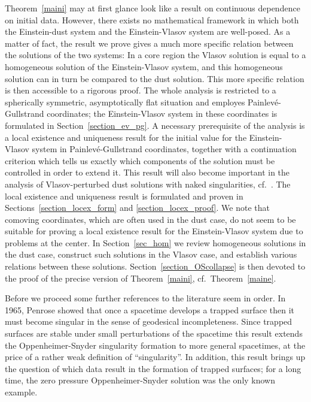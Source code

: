 \documentclass[11pt]{article}
\begin{document}
Theorem~\ref{maini} may
at first glance look like a result on continuous dependence on initial data.
However, there exists no mathematical framework in which both the Einstein-dust
system and the Einstein-Vlasov system are well-posed. As a matter of fact,
the result we prove gives a much more specific relation between the
solutions of the two systems: In a core region the Vlasov solution
is equal to a homogeneous solution of the Einstein-Vlasov system,
and this homogeneous solution can in turn be compared to the dust solution.
This more specific relation is then accessible to a rigorous proof.
The whole analysis is restricted to a spherically symmetric, asymptotically
flat situation and employes Painlev\'{e}-Gullstrand coordinates;
the Einstein-Vlasov system in these coordinates is formulated in
Section~\ref{section_ev_pg}.
A necessary prerequisite of the analysis is a local existence
and uniqueness result for the initial value for the
Einstein-Vlasov system in Painlev\'{e}-Gullstrand coordinates, 
together with a continuation criterion which tells us exactly which
components of the solution must be controlled in order to extend it.
This result will also become important in the analysis of
Vlasov-perturbed dust solutions with naked singularities, cf.~\cite{AR_naked}. 
The local existence and uniqueness result is formulated and proven in
Sections~\ref{section_locex_form} and \ref{section_locex_proof}.
We note that comoving coordinates, which are often used in
the dust case, do not seem to be suitable for proving a local
existence result for the Einstein-Vlasov system due to problems at the
center.
In Section~\ref{sec_hom} we review homogeneous solutions in the dust
case, construct such solutions in the Vlasov case, and establish various
relations between these solutions. Section~\ref{section_OScollapse} is
then devoted to the proof of the precise version of Theorem~\ref{maini},
cf.~Theorem~\ref{maine}.

Before we proceed some further references to the literature seem in order.
In 1965, {\sc Penrose} \cite{pen} showed that once a spacetime develops
a trapped surface then it must become singular in the sense of geodesical
incompleteness. Since trapped surfaces are stable under small perturbations
of the spacetime this result extends the Oppenheimer-Snyder
singularity formation to
more general spacetimes, at the price of a rather weak definition
of ``singularity''. In addition, this result brings up the question
of which data result in the formation of trapped surfaces;
for a long time, the zero pressure
Oppenheimer-Snyder solution was the only
known example.
\end{document}
